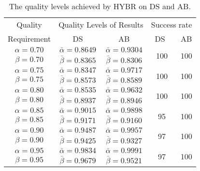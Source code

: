 \begin{table}
\caption{The quality levels achieved by HYBR on DS and AB.}
\vspace{-0.1cm}
\centering
\label{tab:hyb-quality}
\begin{tabular}{|c|c|c|c|c|}
\hline
Quality & \multicolumn{2}{c|}{Quality Levels of Results} & \multicolumn{2}{c|}{Success rate}\\
\cline{2-5}
Requirement & DS & AB  & \ DS\ \  & AB  \\
\hline
$\alpha=0.70$ & $\bar{\alpha}=0.8649$ & $\bar{\alpha}=0.9304$ & \multirow{2}{*}{100} & \multirow{2}{*}{100} \\
$\beta=0.70$ & $\bar{\beta}=0.8365$ & $\bar{\beta}=0.8306$ & & \\
\hline
$\alpha=0.75$ & $\bar{\alpha}=0.8347$ & $\bar{\alpha}=0.9717$ & \multirow{2}{*}{100} & \multirow{2}{*}{100}\\
$\beta=0.75$ & $\bar{\beta}=0.8573$ & $\bar{\beta}=0.8589$ & &\\
\hline
$\alpha=0.80$ & $\bar{\alpha}=0.8535$ & $\bar{\alpha}=0.9632$ & \multirow{2}{*}{100} & \multirow{2}{*}{100}\\
$\beta=0.80$ & $\bar{\beta}=0.8937$ & $\bar{\beta}=0.8946$ & &\\
\hline
$\alpha=0.85$ & $\bar{\alpha}=0.9015$ & $\bar{\alpha}=0.9898$ & \multirow{2}{*}{95} & \multirow{2}{*}{100}\\
$\beta=0.85$ & $\bar{\beta}=0.9171$ & $\bar{\beta}=0.9160$ & &\\
\hline
$\alpha=0.90$ & $\bar{\alpha}=0.9487$ & $\bar{\alpha}=0.9957$ & \multirow{2}{*}{97} & \multirow{2}{*}{100} \\
$\beta=0.90$ & $\bar{\beta}=0.9425$ & $\bar{\beta}=0.9327$ & &\\
\hline
$\alpha=0.95$ & $\bar{\alpha}=0.9834$ & $\bar{\alpha}=0.9991$ & \multirow{2}{*}{97} & \multirow{2}{*}{100} \\
$\beta=0.95$ & $\bar{\beta}=0.9679$ & $\bar{\beta}=0.9521$ & &\\
\hline
\end{tabular}
\end{table}

